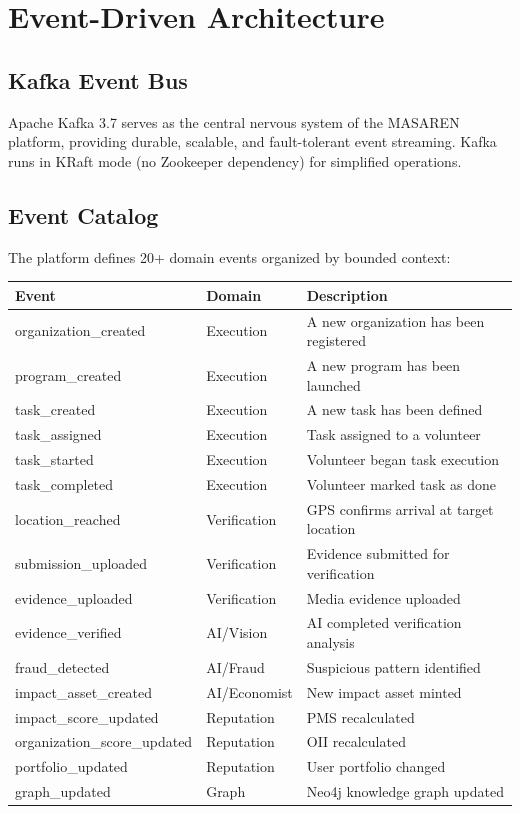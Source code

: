 \section{Event-Driven Architecture}

\subsection{Kafka Event Bus}

Apache Kafka 3.7 serves as the central nervous system of the MASAREN platform, providing durable, scalable, and fault-tolerant event streaming. Kafka runs in KRaft mode (no Zookeeper dependency) for simplified operations.

\subsection{Event Catalog}

The platform defines 20+ domain events organized by bounded context:

\begin{longtable}{|p{4cm}|p{3cm}|p{6cm}|}
\hline
\textbf{Event} & \textbf{Domain} & \textbf{Description} \\
\hline
\endhead
organization\_created & Execution & A new organization has been registered \\
\hline
program\_created & Execution & A new program has been launched \\
\hline
task\_created & Execution & A new task has been defined \\
\hline
task\_assigned & Execution & Task assigned to a volunteer \\
\hline
task\_started & Execution & Volunteer began task execution \\
\hline
task\_completed & Execution & Volunteer marked task as done \\
\hline
location\_reached & Verification & GPS confirms arrival at target location \\
\hline
submission\_uploaded & Verification & Evidence submitted for verification \\
\hline
evidence\_uploaded & Verification & Media evidence uploaded \\
\hline
evidence\_verified & AI/Vision & AI completed verification analysis \\
\hline
fraud\_detected & AI/Fraud & Suspicious pattern identified \\
\hline
impact\_asset\_created & AI/Economist & New impact asset minted \\
\hline
impact\_score\_updated & Reputation & PMS recalculated \\
\hline
organization\_score\_updated & Reputation & OII recalculated \\
\hline
portfolio\_updated & Reputation & User portfolio changed \\
\hline
graph\_updated & Graph & Neo4j knowledge graph updated \\
\hline
\end{longtable}

